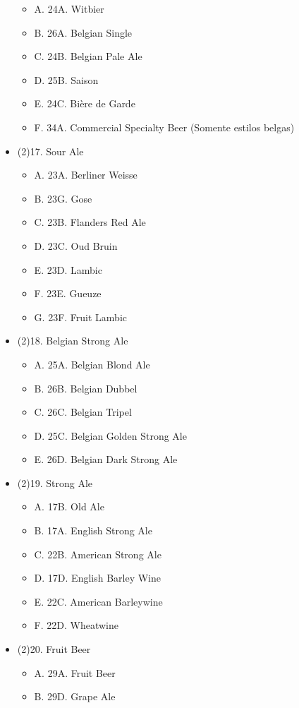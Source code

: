 \begin{multicols*}{2}
\begin{itemize}[noitemsep]
\begin{itemize}
  \item[] A. 24A. Witbier
  \item[] B. 26A. Belgian Single
  \item[] C. 24B. Belgian Pale Ale
  \item[] D. 25B. Saison
  \item[] E. 24C. Bière de Garde
  \item[] F. 34A. Commercial Specialty Beer (Somente estilos belgas)
\end{itemize}
\item[] (2)17. Sour Ale
\begin{itemize}
  \item[] A. 23A. Berliner Weisse
  \item[] B. 23G. Gose
  \item[] C. 23B. Flanders Red Ale
  \item[] D. 23C. Oud Bruin
  \item[] E. 23D. Lambic
  \item[] F. 23E. Gueuze
  \item[] G. 23F. Fruit Lambic
\end{itemize}
\item[] (2)18. Belgian Strong Ale
\begin{itemize}
  \item[] A. 25A. Belgian Blond Ale
  \item[] B. 26B. Belgian Dubbel
  \item[] C. 26C. Belgian Tripel
  \item[] D. 25C. Belgian Golden Strong Ale
  \item[] E. 26D. Belgian Dark Strong Ale
\end{itemize}
\item[] (2)19. Strong Ale
\begin{itemize}
  \item[] A. 17B. Old Ale
  \item[] B. 17A. English Strong Ale
  \item[] C. 22B. American Strong Ale
  \item[] D. 17D. English Barley Wine
  \item[] E. 22C. American Barleywine
  \item[] F. 22D. Wheatwine
\end{itemize}
\item[] (2)20. Fruit Beer
\begin{itemize}
  \item[] A. 29A. Fruit Beer
  \item[] B. 29D. Grape Ale

\end{itemize}
\end{itemize}
\end{multicols*}
